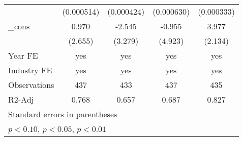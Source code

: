 \begin{table}[htbp]
\begin{tabular}{l*{4}{c}}
                    &  (0.000514)         &  (0.000424)         &  (0.000630)         &  (0.000333)         \\
\_cons              &       0.970         &      -2.545         &      -0.955         &       3.977\sym{*}  \\
                    &     (2.655)         &     (3.279)         &     (4.923)         &     (2.134)         \\
\hline
Year FE             &         yes         &         yes         &         yes         &         yes         \\
Industry FE         &         yes         &         yes         &         yes         &         yes         \\
Observations        &         437         &         433         &         437         &         435         \\
R2-Adj              &       0.768         &       0.657         &       0.687         &       0.827         \\
\hline\hline
\multicolumn{5}{l}{\footnotesize Standard errors in parentheses}\\
\multicolumn{5}{l}{\footnotesize \sym{*} \(p<0.10\), \sym{**} \(p<0.05\), \sym{***} \(p<0.01\)}\\
\end{tabular}
\end{table}

